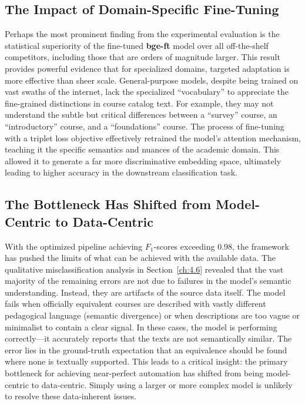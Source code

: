 \subsection{The Impact of Domain-Specific Fine-Tuning}\label{ch:5.1.2}
Perhaps the most prominent finding from the experimental evaluation is the statistical superiority of the fine-tuned \textbf{bge-ft} model over all off-the-shelf competitors, including those that are orders of magnitude larger. This result provides powerful evidence that for specialized domains, targeted adaptation is more effective than sheer scale. General-purpose models, despite being trained on vast swaths of the internet, lack the specialized ``vocabulary'' to appreciate the fine-grained distinctions in course catalog text. For example, they may not understand the subtle but critical differences between a ``survey'' course, an ``introductory'' course, and a ``foundations'' course. The process of fine-tuning with a triplet loss objective effectively retrained the model's attention mechanism, teaching it the specific semantics and nuances of the academic domain. This allowed it to generate a far more discriminative embedding space, ultimately leading to higher accuracy in the downstream classification task.

\subsection{The Bottleneck Has Shifted from Model-Centric to Data-Centric}\label{ch:5.1.3}
With the optimized pipeline achieving \(F_1\)-scores exceeding 0.98, the framework has pushed the limits of what can be achieved with the available data. The qualitative misclassification analysis in Section~\ref{ch:4.6} revealed that the vast majority of the remaining errors are not due to failures in the model's semantic understanding. Instead, they are artifacts of the source data itself. The model fails when officially equivalent courses are described with vastly different pedagogical language (semantic divergence) or when descriptions are too vague or minimalist to contain a clear signal. In these cases, the model is performing correctly—it accurately reports that the texts are not semantically similar. The error lies in the ground-truth expectation that an equivalence should be found where none is textually supported.  This leads to a critical insight: the primary bottleneck for achieving near-perfect automation has shifted from being model-centric to data-centric. Simply using a larger or more complex model is unlikely to resolve these data-inherent issues. 


